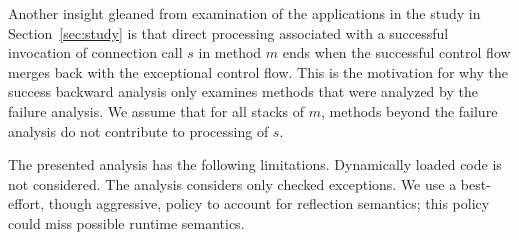 Another insight gleaned from examination of the applications in the
study in Section~\ref{sec:study} is that direct processing associated
with a successful invocation of connection call $s$ in method $m$ ends
when the successful control flow merges back with the exceptional
control flow. This is the motivation for why the success backward
analysis only examines methods that were analyzed by the failure
analysis.  We assume that for all stacks of $m$, methods beyond the
failure analysis do not contribute to processing of $s$.

The presented analysis has the following limitations. Dynamically
loaded code is not considered.  The analysis considers only checked
exceptions.  We use a best-effort, though aggressive, policy to
account for reflection semantics; this policy could miss possible
runtime semantics.  

